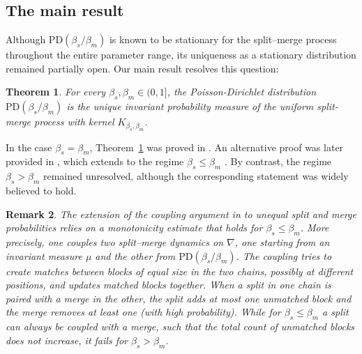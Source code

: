 \documentclass[a4paper,11pt]{article}
\numberwithin{equation}{section}
\newtheorem{theorem}{Theorem}[section]
\newtheorem{remark}[theorem]{Remark}
\begin{document}
\subsection{The main result}

Although $\mathrm{PD}(\beta_s/\beta_m)$ is known to be stationary for the
split--merge process throughout the entire parameter range, its uniqueness as
a stationary distribution remained partially open. Our main result resolves this
question:

\begin{theorem}\label{thm_main}
For every $ \beta_{s}, \beta_{m} \in (0,1] $, the Poisson-Dirichlet distribution $ \mathrm{PD}(\beta_{s} / \beta_{m}) $ is the unique invariant probability measure of the uniform split-merge process with kernel $ K_{\beta_{s}, \beta_{m}} $.
\end{theorem}

In the case $ \beta_{s}= \beta_{m}$,
Theorem~\ref{thm_main} was proved in \cite{DMWZZ2004}. An alternative proof was later provided in \cite{Schramm2005}, which extends to the regime $ \beta_{s} \leqslant \beta_{m} $ \cite[Theorem~7.1(b)]{GUW2011}. By contrast, the regime $\beta_s>\beta_m$ remained unresolved, although the corresponding statement was widely believed to hold.


\begin{remark}\label{rem_notalltheta}
The extension of the coupling argument in \cite{Schramm2005} to unequal split and merge probabilities relies on a monotonicity estimate that holds for $\beta_s\leqslant\beta_m$.
More precisely, one couples two split--merge dynamics on $\nabla$, one starting from an invariant measure $\mu$ and the other from $\mathrm{PD}(\beta_s/\beta_m)$.
The coupling tries to create matches between blocks of equal size in the two chains, possibly at different positions, and updates matched blocks together.
When a split in one chain is paired with a merge in the other, the split adds at most one unmatched block and the merge removes at least one (with high probability).
While for $\beta_s\leqslant\beta_m$ a split can always be coupled with a merge, such that the total count of unmatched blocks does not increase,
it fails for $\beta_s>\beta_m$.
\end{remark}
\end{document}
